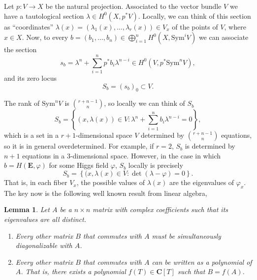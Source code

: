 \documentclass[12pt,a4paper]{book}
\newtheorem{lema}[thm]{Lemma}
\theoremstyle{definition} \newtheorem{defn}[thm]{Definition}
\theoremstyle{definition} \newtheorem{ejemplo}[thm]{Example}
\theoremstyle{remark} \newtheorem{rem}[thm]{Remark}
\def\CC{\mathbf{C}}
\def\Sym{\mathrm{Sym}}
\newcommand{\ve}[1]{\mathbf{#1}}
\begin{document}
  Let $p:V\rightarrow X$ be the natural projection. Associated to the vector bundle $V$ we have a tautological section $\lambda \in H^0(X,p^*V)$. Locally, we can think of this section as ``coordinates'' $\lambda(x)=(\lambda_1(x),\dots,\lambda_r(x)) \in V_x$ of the points of $V$, where $x\in X$. Now, to every $b=(b_1,\dots,b_n) \in \bigoplus_{i=1}^n H^0(X,\Sym^i V)$ we can associate the section
  \begin{equation*}
    s_b = \lambda^n + \sum_{i=1}^n p^* b_i \lambda^{n-i} \in H^0(V,p^* \Sym^n V),
  \end{equation*}
  and its zero locus 
  \begin{equation*}
    S_b  = (s_b)_0 \subset V.
  \end{equation*}

  The rank of $\Sym^n V$ is ${r+n-1 \choose n}$, so locally we can think of $S_b$ 
  \begin{equation*}
    S_b = \left\{(x,\lambda(x)) \in V: \lambda^n + \sum_{i=1}^n b_i \lambda^{n-i}=0\right\},
  \end{equation*}
  which is a set in a $r+1$-dimensional space $V$ determined by ${r+n-1 \choose n}$ equations, so it is in general overdetermined. For example, if $r=2$, $S_b$ is determined by $n+1$ equations in a $3$-dimensional space. However, in the case in which $b=H(\ve{E},\varphi)$ for some Higgs field $\varphi$, $S_b$ locally is precisely 
  \begin{equation*}
    S_b=\left\{ (x,\lambda(x) \in V : \det(\lambda- \varphi)=0 \right\}.
  \end{equation*}
  That is, in each fiber $V_x$, the possible values of $\lambda(x)$ are the eigenvalues of $\varphi_x$. The key now is the following well known result from linear algebra,
  \begin{lema}\label{commuting}
    Let $A$ be a $n\times n$ matrix with complex coefficients such that its eigenvalues are all distinct.
    \begin{enumerate}
      \item Every other matrix $B$ that commutes with $A$ must be simultaneously diagonalizable with $A$.
      \item Every other matrix $B$ that commutes with $A$ can be written as a polynomial of $A$. That is, there exists a polynomial $f(T) \in \CC[T]$ such that $B=f(A)$.
    \end{enumerate}
  \end{lema}
\end{document}
